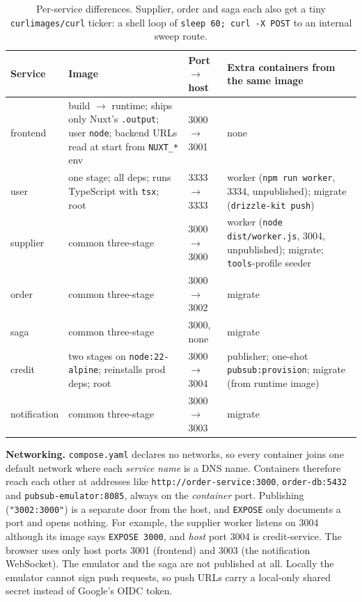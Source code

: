 \documentclass[11pt,a4paper]{article}
\newcommand{\code}[1]{\nolinkurl{#1}}
\begin{document}
\begin{table}[h]
\centering\small
\setlength{\tabcolsep}{4pt}
\begin{tabular}{@{}p{19mm}p{62mm}p{21mm}p{63mm}@{}}
\toprule
Service & Image & Port $\rightarrow$ host & Extra containers from the same image\\
\midrule
frontend & build $\rightarrow$ runtime; ships only Nuxt's \code{.output}; user \code{node}; backend URLs read at start from \code{NUXT_*} env & 3000 $\rightarrow$ 3001 & none\\
user & one stage; all deps; runs TypeScript with \code{tsx}; root & 3333 $\rightarrow$ 3333 & worker (\code{npm run worker}, 3334, unpublished); migrate (\code{drizzle-kit push})\\
supplier & common three-stage & 3000 $\rightarrow$ 3000 & worker (\code{node dist/worker.js}, 3004, unpublished); migrate; \code{tools}-profile seeder\\
order & common three-stage & 3000 $\rightarrow$ 3002 & migrate\\
saga & common three-stage & 3000, none & migrate\\
credit & two stages on \code{node:22-alpine}; reinstalls prod deps; root & 3000 $\rightarrow$ 3004 & publisher; one-shot \code{pubsub:provision}; migrate (from runtime image)\\
notification & common three-stage & 3000 $\rightarrow$ 3003 & migrate\\
\bottomrule
\end{tabular}
\caption{Per-service differences. Supplier, order and saga each also get a tiny
\code{curlimages/curl} ticker: a shell loop of \code{sleep 60; curl -X POST} to an internal sweep route.}
\label{tab:containers}
\end{table}

\textbf{Networking.} \code{compose.yaml} declares no networks, so every container joins one
default network where each \emph{service name} is a DNS name. Containers therefore reach each
other at addresses like \code{http://order-service:3000}, \code{order-db:5432} and
\code{pubsub-emulator:8085}, always on the \emph{container} port. Publishing (\code{"3002:3000"})
is a separate door from the host, and \code{EXPOSE} only documents a port and opens nothing. For
example, the supplier worker listens on 3004 although its image says \code{EXPOSE 3000}, and
\emph{host} port 3004 is credit-service. The browser uses only host ports 3001 (frontend) and 3003
(the notification WebSocket). The emulator and the saga are not published at all. Locally the
emulator cannot sign push requests, so push URLs carry a local-only shared secret instead of
Google's OIDC token.
\end{document}
